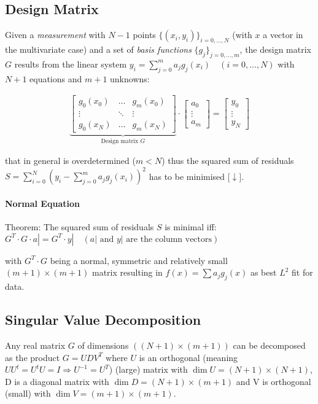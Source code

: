 \subsection{Design Matrix}
Given a \emph{measurement} with $N-1$ points $\{(x_i,y_i)\}_{i=0,\ldots,N}$ (with $x$ a vector in the multivariate case)
and a set of \emph{basis functions} $\{g_j\}_{j=0,\ldots,m}$,
the design matrix $G$ results from the linear system
$y_i=\sum_{j=0}^ma_jg_j(x_i)\quad(i=0,\ldots,N)$ with $N+1$ equations and $m+1$ unknowns:

\begin{snugshade*}
    \begin{align*}
        \underbrace{
            \begin{bmatrix}
                g_0(x_0) & \hdots & g_m(x_0) \\
                \vdots   & \ddots & \vdots   \\
                g_0(x_N) & \hdots & g_m(x_N)
            \end{bmatrix}
        }_{\text{Design matrix }G}
        \cdot
        \begin{bmatrix}
            a_0    \\
            \vdots \\
            a_m
        \end{bmatrix}
        =
        \begin{bmatrix}
            y_0    \\
            \vdots \\
            y_N
        \end{bmatrix}
    \end{align*}
\end{snugshade*}
that in general is overdetermined ($m<N$) thus the squared sum of residuals
$S=\sum_{i=0}^{N}\left(y_{i}-\sum_{j=0}^{m}a_{j}g_{j}(x_{i})\right)^{2}$
has to be minimised [$\downarrow$].

\paragraph{Normal Equation} Theorem: The squared sum of residuals $S$ is minimal iff:
\colorbox{shadecolor}{$
G^T\cdot G\cdot a| = G^T\cdot y|\quad (a|\text{ and }y|\text{ are the column vectors})
$}

with $G^T\cdot G$ being a normal,
symmetric and relatively small $(m+1)\times(m+1)$ matrix resulting in $f(x)=\sum a_jg_j(x)$ as best $L^2$ fit for data.

\subsection{Singular Value Decomposition}
Any real matrix $G$ of dimensions $((N+1)\times (m+1))$ can be decomposed as the product $G=UDV^T$
where $U$ is an orthogonal (meaning $UU^t=U^tU=I\Rightarrow U^{-1}=U^T$) (large) matrix with $\dim U = (N+1)\times (N+1)$,
D is a diagonal matrix with $\dim D = (N+1)\times (m+1)$ and
V is orthogonal (small) with $\dim V = (m+1)\times (m+1)$.

